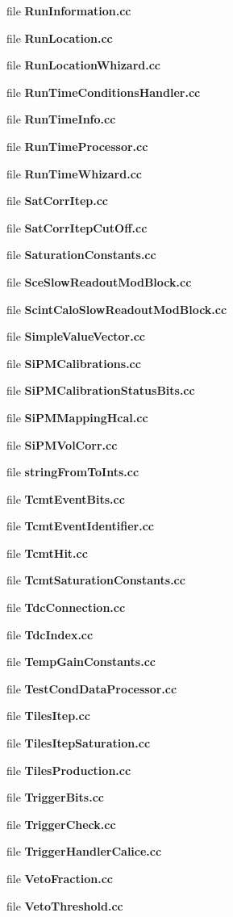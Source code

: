 \begin{DoxyCompactItemize}
file {\bfseries RunInformation.cc}
\item 
file {\bfseries RunLocation.cc}
\item 
file {\bfseries RunLocationWhizard.cc}
\item 
file {\bfseries RunTimeConditionsHandler.cc}
\item 
file {\bfseries RunTimeInfo.cc}
\item 
file {\bfseries RunTimeProcessor.cc}
\item 
file {\bfseries RunTimeWhizard.cc}
\item 
file {\bfseries SatCorrItep.cc}
\item 
file {\bfseries SatCorrItepCutOff.cc}
\item 
file {\bfseries SaturationConstants.cc}
\item 
file {\bfseries SceSlowReadoutModBlock.cc}
\item 
file {\bfseries ScintCaloSlowReadoutModBlock.cc}
\item 
file {\bfseries SimpleValueVector.cc}
\item 
file {\bfseries SiPMCalibrations.cc}
\item 
file {\bfseries SiPMCalibrationStatusBits.cc}
\item 
file {\bfseries SiPMMappingHcal.cc}
\item 
file {\bfseries SiPMVolCorr.cc}
\item 
file {\bfseries stringFromToInts.cc}
\item 
file {\bfseries TcmtEventBits.cc}
\item 
file {\bfseries TcmtEventIdentifier.cc}
\item 
file {\bfseries TcmtHit.cc}
\item 
file {\bfseries TcmtSaturationConstants.cc}
\item 
file {\bfseries TdcConnection.cc}
\item 
file {\bfseries TdcIndex.cc}
\item 
file {\bfseries TempGainConstants.cc}
\item 
file {\bfseries TestCondDataProcessor.cc}
\item 
file {\bfseries TilesItep.cc}
\item 
file {\bfseries TilesItepSaturation.cc}
\item 
file {\bfseries TilesProduction.cc}
\item 
file {\bfseries TriggerBits.cc}
\item 
file {\bfseries TriggerCheck.cc}
\item 
file {\bfseries TriggerHandlerCalice.cc}
\item 
file {\bfseries VetoFraction.cc}
\item 
file {\bfseries VetoThreshold.cc}
\end{DoxyCompactItemize}
